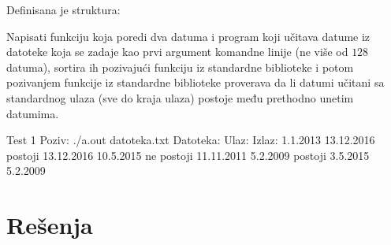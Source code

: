 \begin{Exercise}[label=524]
  Definisana je struktura:
  \begin{ckod}
    typedef struct { int dan; int mesec; int godina; } Datum;}
  \end{ckod}
  Napisati funkciju koja poredi dva datuma i program koji učitava
  datume iz datoteke koja se zadaje kao prvi argument komandne linije
  (ne više od $128$ datuma), sortira ih pozivajući funkciju
   iz standardne biblioteke i potom pozivanjem funkcije
   iz standardne biblioteke proverava da li datumi
  učitani sa standardnog ulaza (sve do kraja ulaza) postoje među
  prethodno unetim datumima.
  
\begin{maxitest}
\begin{test}{Test 1}
Poziv: ./a.out datoteka.txt
Datoteka:            Ulaz:             Izlaz:
1.1.2013             13.12.2016        postoji
13.12.2016           10.5.2015         ne postoji
11.11.2011           5.2.2009          postoji
3.5.2015
5.2.2009
\end{test}
\end{maxitest}
  
\end{Exercise}


\section{Rešenja}
\shipoutAnswer


